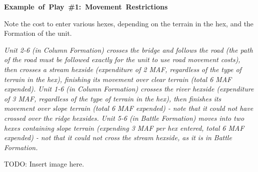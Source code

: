 {\small\noindent\textbf{\mbox{Example of Play \#1: Movement Restrictions}}}

Note the cost to enter various hexes, depending on the terrain in the hex, and the Formation of the unit.

\textit{Unit 2-6 (in Column Formation) crosses the bridge and follows the road (the path of the road must be followed exactly for the unit to use road movement costs), then crosses a stream hexside (expenditure of 2 MAF, regardless of the type of terrain in the hex), finishing its movement over clear terrain (total 6 MAF expended). Unit 1-6 (in Column Formation) crosses the river hexside (expenditure of 3 MAF, regardless of the type of terrain in the hex), then finishes its movement over slope terrain (total 6 MAF expended) - note that it could not have crossed over the ridge hexsides. Unit 5-6 (in Battle Formation) moves into two hexes containing slope terrain (expending 3 MAF per hex entered, total 6 MAF expended) - not that it could not cross the stream hexside, as it is in Battle Formation.}

TODO: Insert image here.
